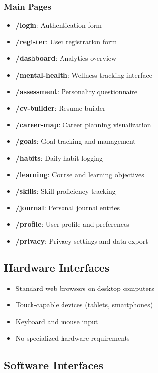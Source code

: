 \documentclass[12pt,a4paper]{article}
\begin{document}
\subsubsection{Main Pages}
\begin{itemize}
    \item \textbf{/login}: Authentication form
    \item \textbf{/register}: User registration form
    \item \textbf{/dashboard}: Analytics overview
    \item \textbf{/mental-health}: Wellness tracking interface
    \item \textbf{/assessment}: Personality questionnaire
    \item \textbf{/cv-builder}: Resume builder
    \item \textbf{/career-map}: Career planning visualization
    \item \textbf{/goals}: Goal tracking and management
    \item \textbf{/habits}: Daily habit logging
    \item \textbf{/learning}: Course and learning objectives
    \item \textbf{/skills}: Skill proficiency tracking
    \item \textbf{/journal}: Personal journal entries
    \item \textbf{/profile}: User profile and preferences
    \item \textbf{/privacy}: Privacy settings and data export
\end{itemize}

\subsection{Hardware Interfaces}
\begin{itemize}
    \item Standard web browsers on desktop computers
    \item Touch-capable devices (tablets, smartphones)
    \item Keyboard and mouse input
    \item No specialized hardware requirements
\end{itemize}

\subsection{Software Interfaces}
\end{document}
